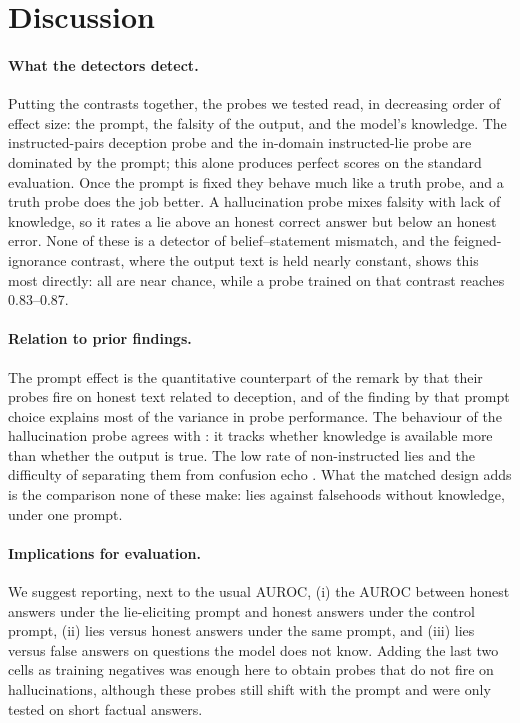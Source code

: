 \section{Discussion}
\label{sec:discussion}

\paragraph{What the detectors detect.} Putting the contrasts together, the probes we tested read, in decreasing order of effect size: the prompt, the falsity of the output, and the model's knowledge. The instructed-pairs deception probe and the in-domain instructed-lie probe are dominated by the prompt; this alone produces perfect scores on the standard evaluation. Once the prompt is fixed they behave much like a truth probe, and a truth probe does the job better. A hallucination probe mixes falsity with lack of knowledge, so it rates a lie above an honest correct answer but below an honest error. None of these is a detector of belief--statement mismatch, and the feigned-ignorance contrast, where the output text is held nearly constant, shows this most directly: all are near chance, while a probe trained on that contrast reaches 0.83--0.87.

\paragraph{Relation to prior findings.} The prompt effect is the quantitative counterpart of the remark by \citet{goldowskydill2025detecting} that their probes fire on honest text related to deception, and of the finding by \citet{natarajan2026oneprobe} that prompt choice explains most of the variance in probe performance. The behaviour of the hallucination probe agrees with \citet{cheang2025really}: it tracks whether knowledge is available more than whether the output is true. The low rate of non-instructed lies and the difficulty of separating them from confusion echo \citet{hopkins2026finetuned}. What the matched design adds is the comparison none of these make: lies against falsehoods without knowledge, under one prompt.

\paragraph{Implications for evaluation.} We suggest reporting, next to the usual AUROC, (i) the AUROC between honest answers under the lie-eliciting prompt and honest answers under the control prompt, (ii) lies versus honest answers under the same prompt, and (iii) lies versus false answers on questions the model does not know. Adding the last two cells as training negatives was enough here to obtain probes that do not fire on hallucinations, although these probes still shift with the prompt and were only tested on short factual answers.

